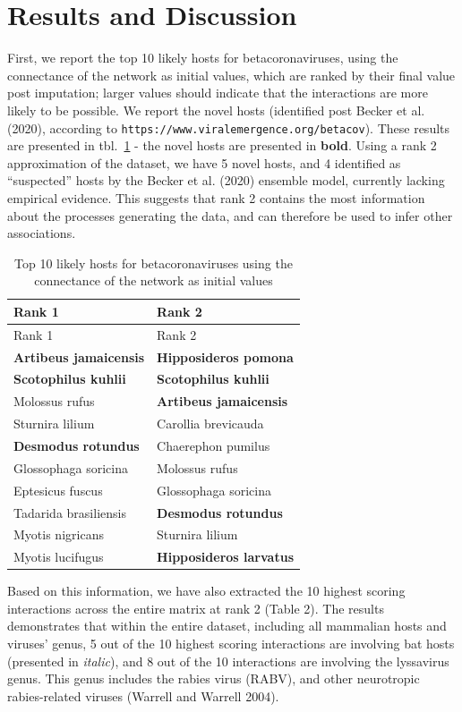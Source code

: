 \documentclass[11pt]{article}
\begin{document}
\hypertarget{results-and-discussion}{%
\section{Results and Discussion}\label{results-and-discussion}}

First, we report the top 10 likely hosts for betacoronaviruses, using
the connectance of the network as initial values, which are ranked by
their final value post imputation; larger values should indicate that
the interactions are more likely to be possible. We report the novel
hosts (identified post Becker et al. (2020), according to
\texttt{https://www.viralemergence.org/betacov}). These results are
presented in tbl.~\ref{tbl:top10} - the novel hosts are presented in
\textbf{bold}. Using a rank 2 approximation of the dataset, we have 5
novel hosts, and 4 identified as ``suspected'' hosts by the Becker et
al. (2020) ensemble model, currently lacking empirical evidence. This
suggests that rank 2 contains the most information about the processes
generating the data, and can therefore be used to infer other
associations.

\hypertarget{tbl:top10}{}
\begin{longtable}[]{@{}ll@{}}
\caption{\label{tbl:top10}Top 10 likely hosts for betacoronaviruses
using the connectance of the network as initial values}\tabularnewline
\toprule
Rank 1 & Rank 2\tabularnewline
\midrule
\endfirsthead
\toprule
Rank 1 & Rank 2\tabularnewline
\midrule
\endhead
\textbf{Artibeus jamaicensis} & \textbf{Hipposideros
pomona}\tabularnewline
\textbf{Scotophilus kuhlii} & \textbf{Scotophilus kuhlii}\tabularnewline
Molossus rufus & \textbf{Artibeus jamaicensis}\tabularnewline
Sturnira lilium & Carollia brevicauda\tabularnewline
\textbf{Desmodus rotundus} & Chaerephon pumilus\tabularnewline
Glossophaga soricina & Molossus rufus\tabularnewline
Eptesicus fuscus & Glossophaga soricina\tabularnewline
Tadarida brasiliensis & \textbf{Desmodus rotundus}\tabularnewline
Myotis nigricans & Sturnira lilium\tabularnewline
Myotis lucifugus & \textbf{Hipposideros larvatus}\tabularnewline
\bottomrule
\end{longtable}

Based on this information, we have also extracted the 10 highest scoring
interactions across the entire matrix at rank 2 (Table 2). The results
demonstrates that within the entire dataset, including all mammalian
hosts and viruses' genus, 5 out of the 10 highest scoring interactions
are involving bat hosts (presented in \emph{italic}), and 8 out of the
10 interactions are involving the lyssavirus genus. This genus includes
the rabies virus (RABV), and other neurotropic rabies-related viruses
(Warrell and Warrell 2004).
\end{document}
